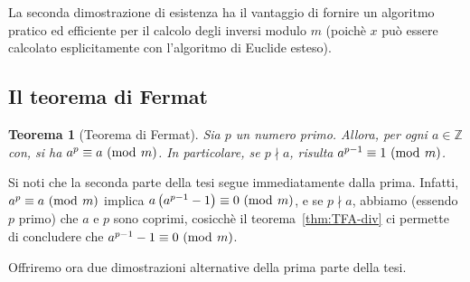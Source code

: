 \documentclass[pdflatex,11pt,a4paper,oneside]{article}
\newcommand{\p}[1]{\left({#1}\right)}
\newcommand{\Z}[0]{\mathbb{Z}}
\newcommand{\notdivides}[0]{\nmid}
\newcommand{\congruent}[0]{\equiv}
\newcommand{\mmodop}[0]{\ensuremath{\operatorname{mod}}}
\newcommand{\mmod}[1]{\ensuremath{\allowbreak\ (\mmodop\:{#1})}}
\newtheorem{theorem}[TheoremLike]{Teorema}
\begin{document}
La seconda dimostrazione di esistenza ha il vantaggio di fornire un
algoritmo pratico ed efficiente per il calcolo degli inversi modulo $m$
(poich\`e $x$ pu\`o essere calcolato esplicitamente con l'algoritmo di
Euclide esteso).


\subsection{Il teorema di Fermat}

\begin{theorem}[Teorema di Fermat]\label{thm:fermat}
Sia $p$ un numero primo. Allora, per ogni $a \in \Z$ con, si ha
$a^p \congruent a \mmod m$.  In particolare, se $p \notdivides a$,
risulta $a^{p-1} \congruent 1 \mmod m$.
\end{theorem}

Si noti che la seconda parte della tesi segue immediatamente dalla prima.
Infatti, $a^p \congruent a \mmod m$ implica $a\p{a^{p-1} - 1} \congruent
0 \mmod m$, e se $p \notdivides a$, abbiamo (essendo $p$ primo) che
$a$ e $p$ sono coprimi, cosicch\`e il teorema~\eqref{thm:TFA-div} ci
permette di concludere che $a^{p-1} - 1 \congruent 0 \mmod m$.

\bigskip
\noindent
Offriremo ora due dimostrazioni alternative della prima parte della tesi.
\end{document}
